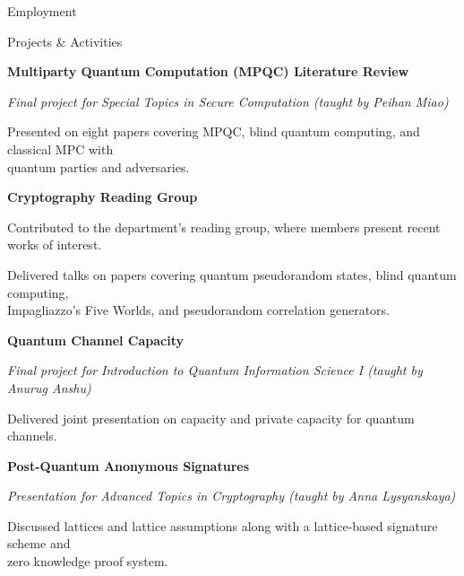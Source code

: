 \documentclass{resume} %
\begin{document}
\begin{grouping}{Employment}
\end{grouping}


\begin{grouping}{Projects \& Activities}

\item {\bf Multiparty Quantum Computation (MPQC) Literature Review}
    \begin{items}
        \item {\em Final project for Special Topics in Secure Computation (taught by Peihan Miao)}
        \item Presented on eight papers covering MPQC, blind quantum computing, and classical MPC with \\
            quantum parties and adversaries.
    \end{items}

\item {\bf Cryptography Reading Group}
    \begin{items}
        \item Contributed to the department's reading group, where members present recent works of interest.
        \item Delivered talks on papers covering quantum pseudorandom states, blind quantum computing, \\
            Impagliazzo's Five Worlds, and pseudorandom correlation generators.
    \end{items}

\item {\bf Quantum Channel Capacity}
    \begin{items}
        \item {\em Final project for Introduction to Quantum Information Science I (taught by Anurug Anshu)}
        \item Delivered joint presentation on capacity and private capacity for quantum channels.
    \end{items}

\item {\bf Post-Quantum Anonymous Signatures}
    \begin{items}
        \item {\em Presentation for Advanced Topics in Cryptography (taught by Anna Lysyanskaya)}
        \item Discussed lattices and lattice assumptions along with a lattice-based signature scheme and \\
            zero knowledge proof system.
    \end{items}

\end{grouping}
\end{document}
